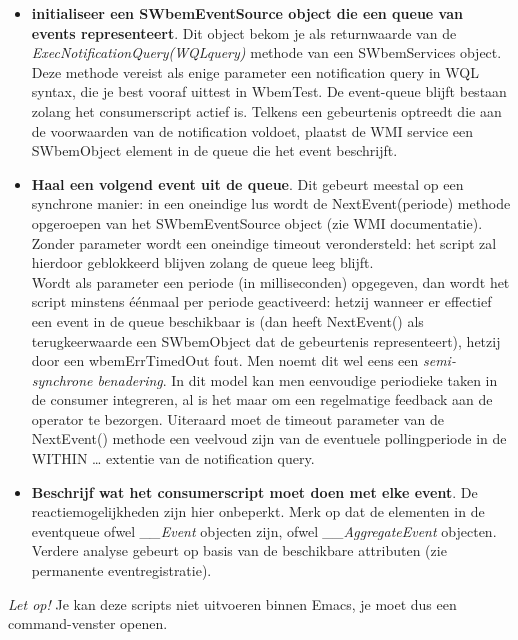 \documentclass[11pt,a4paper]{report}
\begin{document}
\begin{itemize}
	\item \textbf{initialiseer een SWbemEventSource object die een queue van events representeert}. Dit object bekom je als returnwaarde van de \textit{ExecNotificationQuery(WQLquery)} methode van een SWbemServices object.
	Deze methode vereist als enige parameter een notification query in WQL syntax, die je best vooraf uittest in WbemTest.
	De event-queue blijft bestaan zolang het consumerscript actief is. Telkens een gebeurtenis optreedt die aan de voorwaarden van de notification voldoet, plaatst de WMI service een SWbemObject element in de queue die het event beschrijft.
	\item \textbf{Haal een volgend event uit de queue}. Dit gebeurt meestal op een synchrone manier: in een oneindige lus wordt de NextEvent(periode) methode opgeroepen van het SWbemEventSource object (zie WMI documentatie).
	\\Zonder parameter wordt een oneindige timeout verondersteld: het script zal hierdoor geblokkeerd blijven zolang de queue leeg blijft. \\Wordt als parameter een periode (in milliseconden) opgegeven, dan wordt het script minstens éénmaal per periode geactiveerd: hetzij wanneer er effectief een event in de queue beschikbaar is (dan heeft NextEvent() als terugkeerwaarde een SWbemObject dat de gebeurtenis representeert), hetzij door een wbemErrTimedOut fout. Men noemt dit wel eens een \textit{semi-synchrone benadering}. In dit model kan men eenvoudige periodieke taken in de consumer integreren, al is het maar om een regelmatige feedback aan de operator te bezorgen. Uiteraard moet de timeout parameter van de NextEvent() methode een veelvoud zijn van de eventuele pollingperiode in de WITHIN … extentie van de notification query.
	\item \textbf{Beschrijf wat het consumerscript moet doen met elke event}. De reactiemogelijkheden zijn hier onbeperkt.
	Merk op dat de elementen in de eventqueue ofwel \textit{\_\_Event} objecten zijn, ofwel \textit{\_\_AggregateEvent} objecten. Verdere analyse gebeurt op basis van de beschikbare attributen (zie permanente eventregistratie).
\end{itemize}
\textit{Let op!} Je kan deze scripts niet uitvoeren binnen Emacs, je moet dus een command-venster openen.
\end{document}
